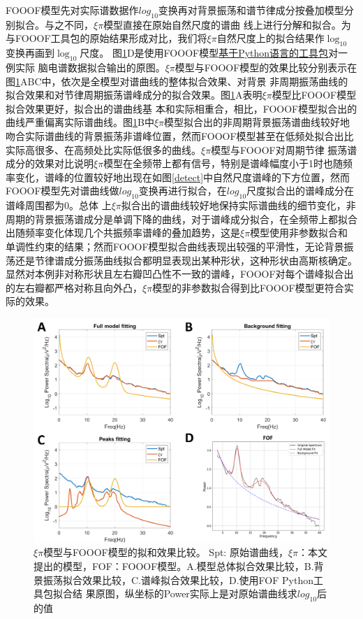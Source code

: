FOOOF模型先对实际谱数据作$log_{10}$变换再对背景振荡和谱节律成分按叠加模型分别拟合。与之不同，$\xi\pi$模型直接在原始自然尺度的谱曲
线上进行分解和拟合。为与FOOOF工具包的原始结果形成对比，我们将$\xi\pi$自然尺度上的拟合结果作$\log_{10}$变换再画到$\log_{10}$尺度。
图\ref{comp}D是使用FOOOF模型\href{https://github.com/fooof-tools/fooof/tree/master/fooof}{基于Python语言的工具包}对一例实际
脑电谱数据拟合输出的原图。$\xi\pi$模型与FOOOF模型的效果比较分别表示在图\ref{comp}ABC中，依次是全模型对谱曲线的整体拟合效果、对背景
非周期振荡曲线的拟合效果和对节律周期振荡谱峰成分的拟合效果。图\ref{comp}A表明$\xi\pi$模型比FOOOF模型拟合效果更好，拟合出的谱曲线基
本和实际相重合，相比，FOOOF模型拟合出的曲线严重偏离实际谱曲线。图\ref{comp}B中$\xi\pi$模型拟合出的非周期背景振荡谱曲线较好地吻合实际谱曲线的背景振荡非谱峰位置，然而FOOOF模型甚至在低频处拟合出比实际高很多、在高频处比实际低很多的曲线。$\xi\pi$模型与FOOOF对周期节律
振荡谱成分的效果对比说明$\xi\pi$模型在全频带上都有信号，特别是谱峰幅度小于1时也随频率变化，谱峰的位置较好地出现在如图\ref{detect}中自然尺度谱峰的下方位置，然而FOOOF模型先对谱曲线做$log_{10}$变换再进行拟合，在$log_{10}$尺度拟合出的谱峰成分在谱峰周围都为0。总体
上$\xi\pi$拟合出的谱曲线较好地保持实际谱曲线的细节变化，非周期的背景振荡谱成分是单调下降的曲线，对于谱峰成分拟合，在全频带上都拟合出随频率变化体现几个共振频率谱峰的叠加趋势，这是$\xi\pi$模型使用非参数拟合和单调性约束的结果；然而FOOOF模型拟合曲线表现出较强的平滑性，无论背景振荡还是节律谱成分振荡曲线拟合都明显表现出某种形状，这种形状由高斯核确定。显然对本例非对称形状且左右瓣凹凸性不一致的谱峰，FOOOF对每个谱峰拟合出的左右瓣都严格对称且向外凸，$\xi\pi$模型的非参数拟合得到比FOOOF模型更符合实际的效果。
\begin{figure}[!h]
	\includegraphics[width=15cm]{pic/xipi/comp.png}
	\caption{$\xi\pi$模型与FOOOF模型的拟和效果比较。 Spt: 原始谱曲线，$\xi\pi$：本文提出的模型，FOF：FOOOF模型。A.模型总体拟合效果比较，B.背景振荡拟合效果比较，C.谱峰拟合效果比较，D.使用FOF Python工具包拟合结
	果原图，纵坐标的Power实际上是对原始谱曲线求$log_{10}$后的值}
	\label{comp}
\end{figure}

